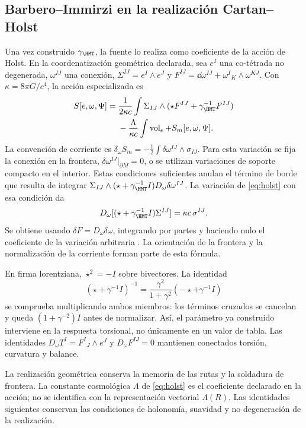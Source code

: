 \subsection{Barbero--Immirzi en la realización Cartan--Holst}
Una vez construido $\gamma_{\HMT}$, la fuente lo realiza como
coeficiente de la acción de Holst. En la coordenatización geométrica declarada,
sea $e^I$ una co-tétrada no degenerada, $\omega^{IJ}$ una conexión,
$\Sigma^{IJ}=e^I\wedge e^J$ y
$F^{IJ}=\dd\omega^{IJ}+\omega^I{}_K\wedge\omega^{KJ}$.
Con $\kappa=8\pi G/c^4$, la acción especializada es
\begin{equation}
\begin{aligned}
S[e,\omega,\Psi]
={}&\frac1{2\kappa c}\int
\Sigma_{IJ}\wedge(\star F^{IJ}+\gamma_{\HMT}^{-1}F^{IJ})\\
&-\frac{\Lambda}{\kappa c}\int\operatorname{vol}_e
+S_m[e,\omega,\Psi].
\end{aligned}
\label{eq:holst}
\end{equation}
La convención de corriente es
$\delta_\omega S_m=-\tfrac12\int\delta\omega^{IJ}\wedge\sigma_{IJ}$.
Para esta variación se fija la conexión en la frontera,
$\delta\omega^{IJ}|_{\partial M}=0$, o se utilizan variaciones de
soporte compacto en el interior. Estas condiciones suficientes anulan
el término de borde que resulta de integrar
$\Sigma_{IJ}\wedge(\star+\gamma_{\HMT}^{-1}I)
D_\omega\delta\omega^{IJ}$.
La variación de \eqref{eq:holst} con esa condición da
\[
D_\omega[(\star+\gamma_{\HMT}^{-1}I)\Sigma^{IJ}]
=\kappa c\,\sigma^{IJ}.
\]
Se obtiene usando $\delta F=D_\omega\delta\omega$, integrando por partes
y haciendo nulo el coeficiente de la variación arbitraria
\cite{holst}. La orientación de la frontera y la normalización
de la corriente forman parte de esta fórmula.

En firma lorentziana, $\star^2=-I$ sobre bivectores. La identidad
\[
(\star+\gamma^{-1}I)^{-1}
=\frac{\gamma^2}{1+\gamma^2}(-\star+\gamma^{-1}I)
\]
se comprueba multiplicando ambos miembros: los términos cruzados se
cancelan y queda $(1+\gamma^{-2})I$ antes de normalizar.
Así, el parámetro ya construido interviene en la respuesta torsional,
no únicamente en un valor de tabla.
Las identidades
$D_\omega T^I=F^I{}_J\wedge e^J$ y $D_\omega F^{IJ}=0$
mantienen conectados torsión, curvatura y balance.

La realización geométrica conserva la memoria de las rutas y la
soldadura de frontera. La constante cosmológica \(\Lambda\) de
\eqref{eq:holst} es el coeficiente declarado en la acción; no se
identifica con la representación vectorial \(\Lambda(R)\).
Las identidades siguientes conservan las condiciones de holonomía,
suavidad y no degeneración de la realización.




